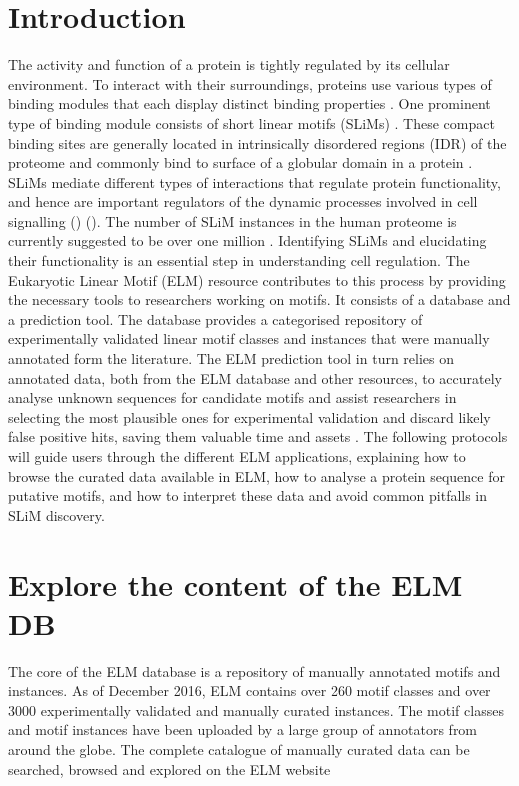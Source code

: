 \documentclass[12pt]{article}
\newcounter{proto}
\begin{document}
\section*{Introduction}%
\label{sec:introduction}

The activity and function of a protein is tightly regulated by its
cellular environment. To interact with their surroundings, proteins use
various types of binding modules that each display distinct binding
properties \cite{10550212}. One prominent type of binding module
consists of short linear motifs (SLiMs) \cite{18508681}. These compact
binding sites are generally located in intrinsically disordered regions
(IDR) of the proteome and commonly bind to
surface of a globular domain in a protein \cite{21909575}. SLiMs mediate
different types of interactions that regulate protein functionality, and hence
are important regulators of the dynamic processes involved in cell
signalling (\cite{22480932}) (\cite{24926813}). The number of
SLiM instances in the human proteome is currently suggested to be over
one million \cite{25038412}. Identifying SLiMs and elucidating their
functionality is an essential step in understanding cell regulation. The
Eukaryotic Linear Motif (ELM) resource contributes to this process by
providing the necessary tools to researchers working on motifs. It
consists of a database and a prediction tool. The database provides a
categorised repository of experimentally validated linear motif classes
and instances that were manually annotated form the literature. The ELM
prediction tool in turn relies on annotated data, both from the ELM
database and other resources, to accurately analyse unknown sequences
for candidate motifs and assist researchers in selecting the most
plausible ones for experimental validation and discard likely false
positive hits, saving them valuable time and assets \cite{22110040}.
The following protocols will guide users through the different ELM
applications, explaining how to browse the curated data available in
ELM, how to analyse a protein sequence for putative motifs, and how to
interpret these data and avoid common pitfalls in SLiM discovery.


\section{Explore the content of the ELM DB}%
\label{sec:explore_content}

The core of the ELM database is a repository of manually annotated motifs and
instances. As of December 2016, ELM contains over 260 motif classes and over
3000 experimentally validated and manually curated instances.
The motif classes and motif instances have been uploaded by a large group of
annotators from around the globe. The complete catalogue of manually curated
data can be searched, browsed and explored on the ELM website
\end{document}
